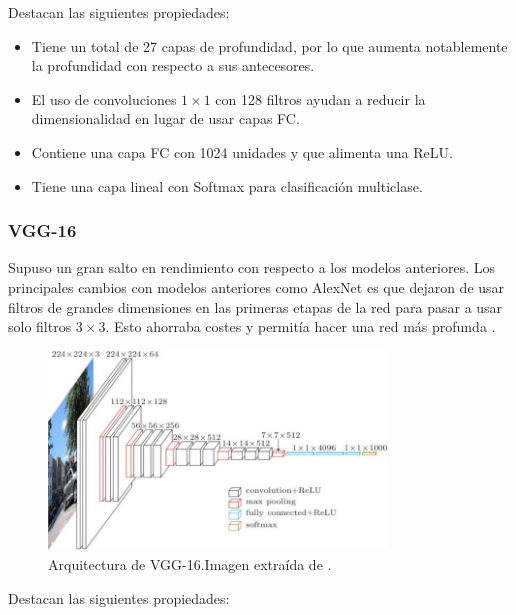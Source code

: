             \noindent Destacan las siguientes propiedades:

            \begin{itemize}
                \item Tiene un total de 27 capas de profundidad, por lo que aumenta notablemente la profundidad con respecto a sus antecesores.
                \item El uso de convoluciones $1\times 1$ con 128 filtros ayudan a reducir la dimensionalidad en lugar de usar capas FC.
                \item Contiene una capa FC con 1024 unidades y que alimenta una ReLU. 
                \item Tiene una capa lineal con Softmax para clasificación multiclase.
            \end{itemize}

        \subsubsection{VGG-16}
            \noindent Supuso un gran salto en rendimiento con respecto a los modelos anteriores. Los principales cambios con modelos anteriores como AlexNet es que dejaron de usar filtros de grandes dimensiones en las primeras etapas de la red para pasar a usar solo filtros $3 \times 3$. Esto ahorraba costes y permitía hacer una red más profunda \cite{simonyan2014very}.

            \begin{figure}[!h]
                \centering
                \includegraphics[width=0.8\textwidth]{img/VGG-16.jpeg}
                \caption{Arquitectura de VGG-16.Imagen extraída de \cite{StanfordCourse}.}
                \label{fig:VGG}
            \end{figure}

            \noindent Destacan las siguientes propiedades:

